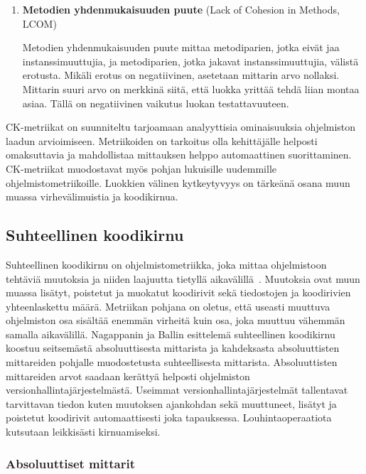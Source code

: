 \documentclass[finnish]{tktltiki2}
\theoremstyle{definition}
\theoremstyle{remark}
\begin{document}
\begin{enumerate}
  \item \textbf{Metodien yhdenmukaisuuden puute} (Lack of Cohesion in Methods, LCOM)

  Metodien yhdenmukaisuuden puute mittaa metodiparien, jotka eivät jaa instanssimuuttujia, ja metodiparien, jotka jakavat instanssimuuttujia, välistä erotusta. Mikäli erotus on negatiivinen, asetetaan mittarin arvo nollaksi. Mittarin suuri arvo on merkkinä siitä, että luokka yrittää tehdä liian montaa asiaa. Tällä on negatiivinen vaikutus luokan testattavuuteen.
\end{enumerate}

CK-metriikat on suunniteltu tarjoamaan analyyttisia ominaisuuksia ohjelmiston laadun arvioimiseen. Metriikoiden on tarkoitus olla kehittäjälle helposti omaksuttavia ja mahdollistaa mittauksen helppo automaattinen suorittaminen. CK-metriikat muodostavat myös pohjan lukuisille uudemmille ohjelmistometriikoille. Luokkien välinen kytkeytyvyys on tärkeänä osana muun muassa virhevälimuistia ja koodikirnua.

\subsection{Suhteellinen koodikirnu}

Suhteellinen koodikirnu on ohjelmistometriikka, joka mittaa ohjelmistoon tehtäviä muutoksia ja niiden laajuutta tietyllä aikavälillä~\cite{NB05}. Muutoksia ovat muun muassa lisätyt, poistetut ja muokatut koodirivit sekä tiedostojen ja koodirivien yhteenlaskettu määrä. Metriikan pohjana on oletus, että useasti muuttuva ohjelmiston osa sisältää enemmän virheitä kuin osa, joka muuttuu vähemmän samalla aikavälillä. Nagappanin ja Ballin esittelemä suhteellinen koodikirnu koostuu seitsemästä absoluuttisesta mittarista ja kahdeksasta absoluuttisten mittareiden pohjalle muodostetusta suhteellisesta mittarista. Absoluuttisten mittareiden arvot saadaan kerättyä helposti ohjelmiston versionhallintajärjestelmästä. Useimmat versionhallintajärjestelmät tallentavat tarvittavan tiedon kuten muutoksen ajankohdan sekä muuttuneet, lisätyt ja poistetut koodirivit automaattisesti joka tapauksessa. Louhintaoperaatiota kutsutaan leikkisästi kirnuamiseksi.

\subsubsection{Absoluuttiset mittarit}
\end{document}
